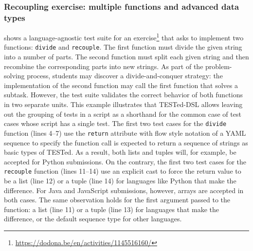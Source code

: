 \documentclass[../main]{subfiles}
\begin{document}
\subsubsection{Recoupling exercise: multiple functions and advanced data types}\label{subsubsec:recoupling-exercise:-multiple-functions-and-advanced-data-types}

 shows a language-agnostic test suite for an exercise\footnote{\url{https://dodona.be/en/activities/1145516160/}} that asks to implement two functions: \texttt{divide} and \texttt{recouple}.
The first function must divide the given string into a number of parts.
The second function must split each given string and then recombine the corresponding parts into new strings.
As part of the problem-solving process, students may discover a divide-and-conquer strategy: the implementation of the second function may call the first function that solves a subtask.
However, the test suite validates the correct behavior of both functions in two separate units.
This example illustrates that TESTed-DSL allows leaving out the grouping of tests in a script as a shorthand for the common case of test cases whose script has a single test.
The first two test cases for the \texttt{divide} function (lines 4--7) use the \texttt{return} attribute with flow style notation of a YAML sequence to specify the function call is expected to return a sequence of strings as basic types of TESTed.
As a result, both lists and tuples will, for example, be accepted for Python submissions.
On the contrary, the first two test cases for the \texttt{recouple} function (lines 11--14) use an explicit cast to force the return value to be a list (line 12) or a tuple (line 14) for languages like Python that make the difference.
For Java and JavaScript submissions, however, arrays are accepted in both cases.
The same observation holds for the first argument passed to the function: a list (line 11) or a tuple (line 13) for languages that make the difference, or the default sequence type for other languages.
\end{document}
